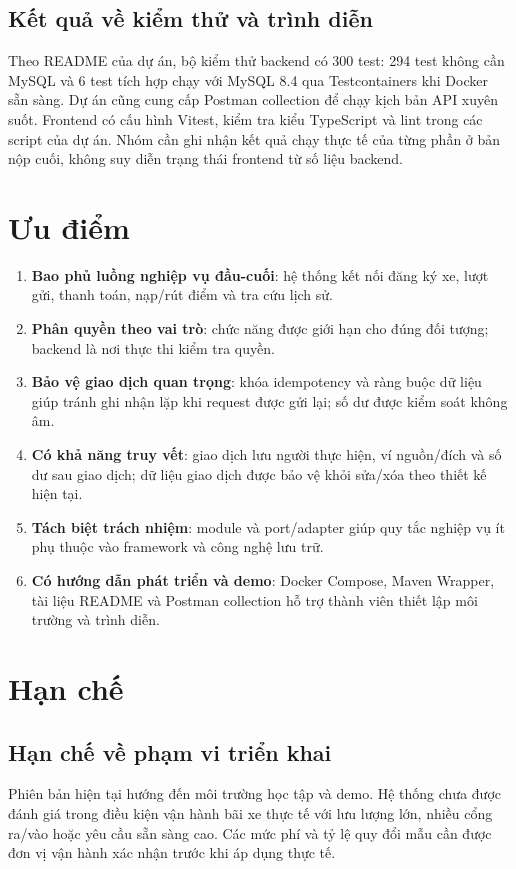 \subsection{Kết quả về kiểm thử và trình diễn}
Theo README của dự án, bộ kiểm thử backend có 300 test: 294 test không cần MySQL và 6 test tích hợp chạy với MySQL 8.4 qua Testcontainers khi Docker sẵn sàng. Dự án cũng cung cấp Postman collection để chạy kịch bản API xuyên suốt. Frontend có cấu hình Vitest, kiểm tra kiểu TypeScript và lint trong các script của dự án. Nhóm cần ghi nhận kết quả chạy thực tế của từng phần ở bản nộp cuối, không suy diễn trạng thái frontend từ số liệu backend.

\section{Ưu điểm}

\begin{enumerate}[label=\arabic*)]
    \item \textbf{Bao phủ luồng nghiệp vụ đầu-cuối}: hệ thống kết nối đăng ký xe, lượt gửi, thanh toán, nạp/rút điểm và tra cứu lịch sử.
    \item \textbf{Phân quyền theo vai trò}: chức năng được giới hạn cho đúng đối tượng; backend là nơi thực thi kiểm tra quyền.
    \item \textbf{Bảo vệ giao dịch quan trọng}: khóa idempotency và ràng buộc dữ liệu giúp tránh ghi nhận lặp khi request được gửi lại; số dư được kiểm soát không âm.
    \item \textbf{Có khả năng truy vết}: giao dịch lưu người thực hiện, ví nguồn/đích và số dư sau giao dịch; dữ liệu giao dịch được bảo vệ khỏi sửa/xóa theo thiết kế hiện tại.
    \item \textbf{Tách biệt trách nhiệm}: module và port/adapter giúp quy tắc nghiệp vụ ít phụ thuộc vào framework và công nghệ lưu trữ.
    \item \textbf{Có hướng dẫn phát triển và demo}: Docker Compose, Maven Wrapper, tài liệu README và Postman collection hỗ trợ thành viên thiết lập môi trường và trình diễn.
\end{enumerate}

\section{Hạn chế}

\subsection{Hạn chế về phạm vi triển khai}
Phiên bản hiện tại hướng đến môi trường học tập và demo. Hệ thống chưa được đánh giá trong điều kiện vận hành bãi xe thực tế với lưu lượng lớn, nhiều cổng ra/vào hoặc yêu cầu sẵn sàng cao. Các mức phí và tỷ lệ quy đổi mẫu cần được đơn vị vận hành xác nhận trước khi áp dụng thực tế.

